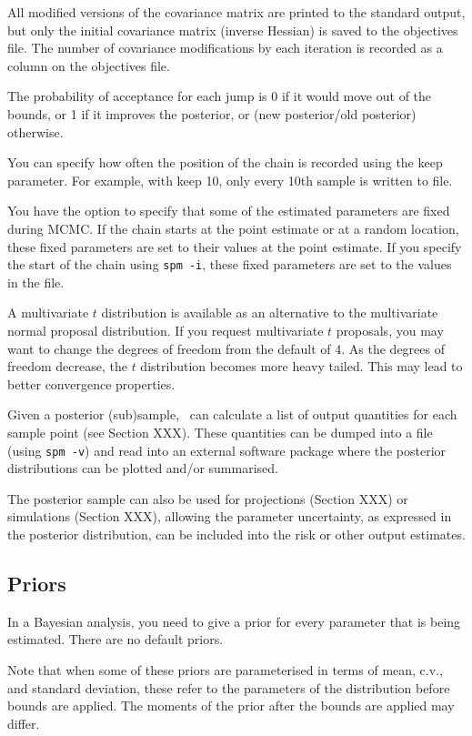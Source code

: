 All modified versions of the covariance matrix are printed to the standard output, but only the initial covariance matrix (inverse Hessian) is saved to the objectives file. The number of covariance modifications by each iteration is recorded as a column on the objectives file. 

The probability of acceptance for each jump is 0 if it would move out of the bounds, or 1 if it improves the posterior, or (new posterior/old posterior) otherwise. 

You can specify how often the position of the chain is recorded using the keep parameter. For example, with keep 10, only every 10th sample is written to file. 

You have the option to specify that some of the estimated parameters are fixed during MCMC. If the chain starts at the point estimate or at a random location, these fixed parameters are set to their values at the point estimate. If you specify the start of the chain using \texttt{spm -i}, these fixed parameters are set to the values in the file.

A multivariate $t$ distribution is available as an alternative to the multivariate normal proposal distribution. If you request multivariate $t$ proposals, you may want to change the degrees of freedom from the default of 4. As the degrees of freedom decrease, the $t$ distribution becomes more heavy tailed. This may lead to better convergence properties.

Given a posterior (sub)sample, \SPM\ can calculate a list of output quantities for each sample point (see Section XXX). These quantities can be dumped into a file (using \texttt{spm -v}) and read into an external software package where the posterior distributions can be plotted and/or summarised. 

The posterior sample can also be used for projections (Section XXX) or simulations (Section XXX), allowing the parameter uncertainty, as expressed in the posterior distribution, can be included into the risk or other output estimates.

\subsection{Priors\label{sec:priors}}

In a Bayesian analysis, you need to give a prior for every parameter that is being estimated. There are no default priors.  

Note that when some of these priors are parameterised in terms of mean, c.v., and standard deviation, these refer to the parameters of the distribution before bounds are applied. The moments of the prior after the bounds are applied may differ.

